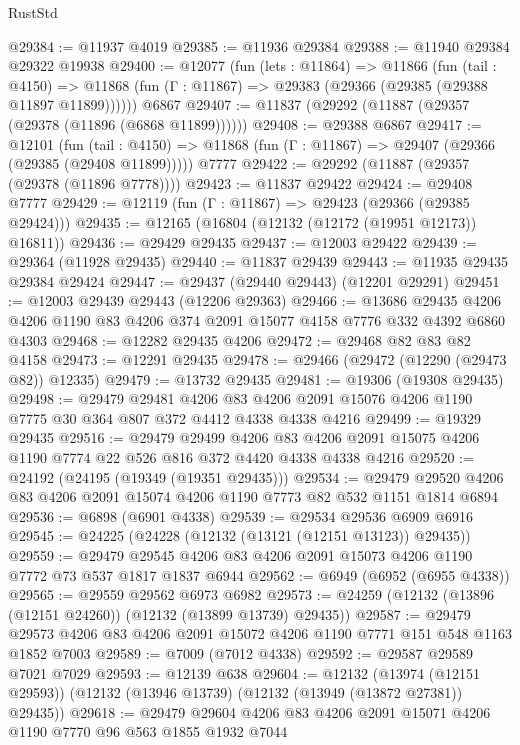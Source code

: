 \begin{lexlean}{RustStd}
\begin{coremodule}
{\begin{coremodule}
{{{{{{{{{{{{{{{{{{{{{{{{{{{{{{{{{{{{{{{{{{{{{{{{{{@29384 := @11937 @4019
@29385 := @11936 @29384
@29388 := @11940 @29384 @29322 @19938
@29400 := @12077
    (fun (lets : @11864) =>
    @11866
      (fun (tail : @4150) =>
      @11868 (fun (Γ : @11867) => @29383 (@29366 (@29385 (@29388 @11897 @11899))))))
    @6867
@29407 := @11837 (@29292 (@11887 (@29357 (@29378 (@11896 (@6868 @11899))))))
@29408 := @29388 @6867
@29417 := @12101
    (fun (tail : @4150) => @11868 (fun (Γ : @11867) => @29407 (@29366 (@29385 (@29408 @11899)))))
    @7777
@29422 := @29292 (@11887 (@29357 (@29378 (@11896 @7778))))
@29423 := @11837 @29422
@29424 := @29408 @7777
@29429 := @12119 (fun (Γ : @11867) => @29423 (@29366 (@29385 @29424)))
@29435 := @12165 (@16804 (@12132 (@12172 (@19951 @12173)) @16811))
@29436 := @29429 @29435
@29437 := @12003 @29422
@29439 := @29364 (@11928 @29435)
@29440 := @11837 @29439
@29443 := @11935 @29435 @29384 @29424
@29447 := @29437 (@29440 @29443) (@12201 @29291)
@29451 := @12003 @29439 @29443 (@12206 @29363)
@29466 := @13686
    @29435
    @4206
    @4206
    @1190
    @83
    @4206
    @374
    @2091
    @15077
    @4158
    @7776
    @332
    @4392
    @6860
    @4303
@29468 := @12282 @29435 @4206
@29472 := @29468 @82 @83 @82 @4158
@29473 := @12291 @29435
@29478 := @29466 (@29472 (@12290 (@29473 @82)) @12335)
@29479 := @13732 @29435
@29481 := @19306 (@19308 @29435)
@29498 := @29479
    @29481
    @4206
    @83
    @4206
    @2091
    @15076
    @4206
    @1190
    @7775
    @30
    @364
    @807
    @372
    @4412
    @4338
    @4338
    @4216
@29499 := @19329 @29435
@29516 := @29479
    @29499
    @4206
    @83
    @4206
    @2091
    @15075
    @4206
    @1190
    @7774
    @22
    @526
    @816
    @372
    @4420
    @4338
    @4338
    @4216
@29520 := @24192 (@24195 (@19349 (@19351 @29435)))
@29534 := @29479 @29520 @4206 @83 @4206 @2091 @15074 @4206 @1190 @7773 @82 @532 @1151 @1814 @6894
@29536 := @6898 (@6901 @4338)
@29539 := @29534 @29536 @6909 @6916
@29545 := @24225 (@24228 (@12132 (@13121 (@12151 @13123)) @29435))
@29559 := @29479 @29545 @4206 @83 @4206 @2091 @15073 @4206 @1190 @7772 @73 @537 @1817 @1837 @6944
@29562 := @6949 (@6952 (@6955 @4338))
@29565 := @29559 @29562 @6973 @6982
@29573 := @24259 (@12132 (@13896 (@12151 @24260)) (@12132 (@13899 @13739) @29435))
@29587 := @29479 @29573 @4206 @83 @4206 @2091 @15072 @4206 @1190 @7771 @151 @548 @1163 @1852 @7003
@29589 := @7009 (@7012 @4338)
@29592 := @29587 @29589 @7021 @7029
@29593 := @12139 @638
@29604 := @12132
    (@13974 (@12151 @29593))
    (@12132 (@13946 @13739) (@12132 (@13949 (@13872 @27381)) @29435))
@29618 := @29479 @29604 @4206 @83 @4206 @2091 @15071 @4206 @1190 @7770 @96 @563 @1855 @1932 @7044
}}}}}}}}}}}}}}}}}}}}}}}}}}}}}}}}}}}}}}}}}}}}}}}}}}
\end{coremodule}}
\end{coremodule}
\end{lexlean}
